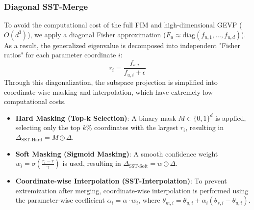 \documentclass{article}
\begin{document}
\subsubsection{Diagonal SST-Merge}

To avoid the computational cost of the full FIM and high-dimensional GEVP ($O(d^3)$), we apply a diagonal Fisher approximation ($F_u \approx \text{diag}(f_{u,1}, \dots, f_{u,d})$). As a result, the generalized eigenvalue is decomposed into independent "Fisher ratios" for each parameter coordinate $i$:
\[ r_i = \frac{f_{s,i}}{f_{u,i} + \epsilon} \]
Through this diagonalization, the subspace projection is simplified into coordinate-wise masking and interpolation, which have extremely low computational costs.
\begin{itemize}
    \item \textbf{Hard Masking (Top-k Selection)}: A binary mask $M \in \{0, 1\}^d$ is applied, selecting only the top $k$\% coordinates with the largest $r_i$, resulting in $\Delta_{\text{SST-Hard}} = M \odot \Delta$.
    \item \textbf{Soft Masking (Sigmoid Masking)}: A smooth confidence weight $w_i = \sigma\left(\frac{r_i - \tau}{\gamma}\right)$ is used, resulting in $\Delta_{\text{SST-Soft}} = w \odot \Delta$.
    \item \textbf{Coordinate-wise Interpolation (SST-Interpolation)}: To prevent extremization after merging, coordinate-wise interpolation is performed using the parameter-wise coefficient $\alpha_i = \alpha \cdot w_i$, where $\theta_{m,i} = \theta_{u,i} + \alpha_i (\theta_{s,i} - \theta_{u,i})$.
\end{itemize}
\end{document}
